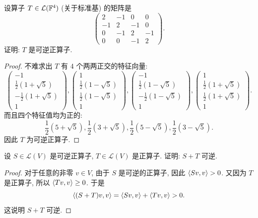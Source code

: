 \documentclass{article}
\begin{document}
\begin{problem}[7C-2]
设算子 $T \in \mathcal{L}(\mathbb{F}^4)$ (关于标准基) 的矩阵是
\[
\begin{pmatrix}
2 & -1 & 0 & 0 \\
-1 & 2 & -1 & 0 \\
0 & -1 & 2 & -1 \\
0 & 0 & -1 & 2
\end{pmatrix}.
\]
证明: $T$ 是可逆正算子.
\end{problem}

\begin{proof}
  不难求出 \( T \) 有 \( 4 \) 个两两正交的特征向量:
  \[ \begin{pmatrix}
    -1 \\ \frac{1}{2}(1+\sqrt{5}) \\ -\frac{1}{2}(1+\sqrt{5}) \\ 1
  \end{pmatrix}, \begin{pmatrix}
    1 \\ \frac{1}{2}(1-\sqrt{5}) \\ \frac{1}{2}(1-\sqrt{5}) \\ 1
  \end{pmatrix}, \begin{pmatrix}
    -1 \\ \frac{1}{2}(1-\sqrt{5}) \\ -\frac{1}{2}(1-\sqrt{5}) \\ 1
  \end{pmatrix}, \begin{pmatrix}
    1 \\ \frac{1}{2}(1+\sqrt{5}) \\ \frac{1}{2}(1+\sqrt{5}) \\ 1 
  \end{pmatrix}. \]
  而且四个特征值均为正的: 
  \[ \frac{1}{2}(5+\sqrt{5}), \frac{1}{2}(3+\sqrt{5}), \frac{1}{2}(5-\sqrt{5}), \frac{1}{2}(3-\sqrt{5}). \]
  因此 \( T \) 为可逆正算子.
\end{proof}



\begin{problem}[7C-7]
设 $S \in \mathcal{L}(V)$ 是可逆正算子, $T \in \mathcal{L}(V)$ 是正算子. 证明: $S + T$ 可逆.
\end{problem}

\begin{proof}
  对于任意的非零 \( v\in V \), 由于 \( S \) 是可逆的正算子, 因此 \( \left\langle Sv, v \right\rangle > 0 \). 又因为 \( T \) 是正算子, 所以 \( \left\langle Tv, v \right\rangle \ge 0 \). 于是
  \[
  \left\langle (S + T)v, v \right\rangle = \left\langle Sv, v \right\rangle + \left\langle Tv, v \right\rangle > 0.
  \]
  这说明 \( S + T \) 可逆.
\end{proof}
\end{document}
